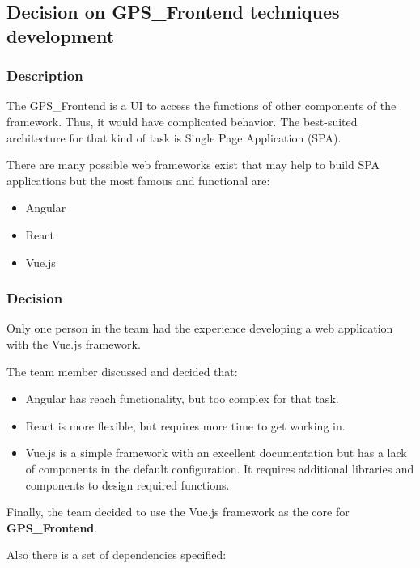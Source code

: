 \subsection{Decision on GPS\_Frontend techniques
development}\label{decision-on-gps_frontend-techniques-development}

\subsubsection{Description}\label{description}

The GPS\_Frontend is a UI to access the functions of other components of
the framework. Thus, it would have complicated behavior. The best-suited
architecture for that kind of task is Single Page Application (SPA).

There are many possible web frameworks exist that may help to build SPA
applications but the most famous and functional are:

\begin{itemize}
\tightlist
\item
  Angular
\item
  React
\item
  Vue.js
\end{itemize}

\subsubsection{Decision}\label{decision}

Only one person in the team had the experience developing a web
application with the Vue.js framework.

The team member discussed and decided that:

\begin{itemize}
\tightlist
\item
  Angular has reach functionality, but too complex for that task.
\item
  React is more flexible, but requires more time to get working in.
\item
  Vue.js is a simple framework with an excellent documentation but has a
  lack of components in the default configuration. It requires
  additional libraries and components to design required functions.
\end{itemize}

Finally, the team decided to use the Vue.js framework as the core for
\textbf{GPS\_Frontend}.

Also there is a set of dependencies specified:

